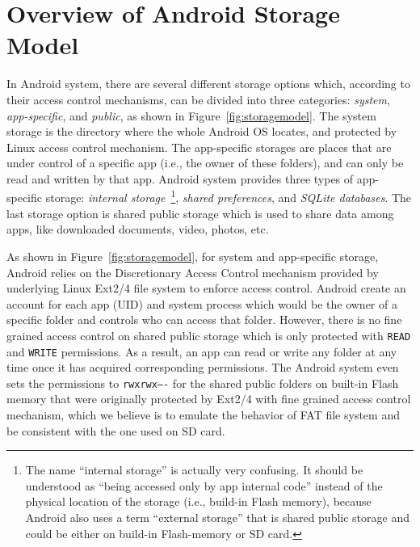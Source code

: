 \documentclass{sig-alternate}
\newcommand{\ignore}[1]{}
\begin{document}
\section{Overview of Android Storage \\Model}
\label{androidStorageModel}

In Android system, there are several different storage options which, according to their access control mechanisms, can be divided into three categories: \textit{system}, \textit{app-specific}, and \textit{public}, as shown in Figure~\ref{fig:storagemodel}. The system storage is the directory where the whole Android OS locates, and protected by Linux access control mechanism. The app-specific storages are places that are under control of a specific app (i.e., the owner of these folders), and can only be read and written by that app. Android system provides three types of app-specific storage: \textit{internal storage}~\footnote{The name ``internal storage'' is actually very confusing. It should be understood as ``being accessed only by app internal code'' instead of the physical location of the storage (i.e., build-in Flash memory), because Android also uses a term ``external storage'' that is shared public storage and could be either on build-in Flash-memory or SD card.},  \textit{shared preferences}, and \textit{SQLite databases}. The last storage option is shared public storage which is used to share data among apps, like downloaded documents, video, photos, etc.


\ignore{can only be read and/or write by a system process.  /proc files belong to system? but can be read A typical example}

\begin{figure}[t]
\end{figure}

As shown in Figure~\ref{fig:storagemodel}, for system and app-specific storage, Android relies on the Discretionary Access Control mechanism provided by underlying Linux Ext2/4 file system to enforce access control. Android create an account for each app (UID) and system process which would be the owner of a specific folder and controls who can access that folder. However, there is no fine grained access control on shared public storage which is only protected with \texttt{READ} and \texttt{WRITE} permissions. As a result, an app can read or write any folder at any time once it has acquired corresponding permissions. The Android system even sets the permissions to \texttt{rwxrwx----} for the shared public folders on built-in Flash memory that were originally protected by Ext2/4 with fine grained access control mechanism, which we believe is to emulate the behavior of FAT file system and be consistent with the one used on SD card.
\end{document}
